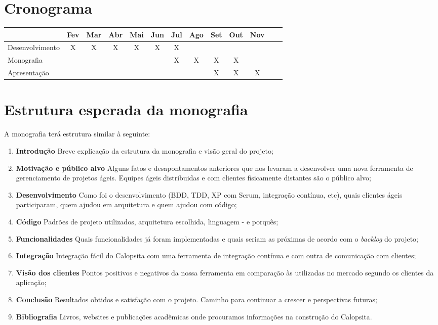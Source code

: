 \documentclass[titlepage]{article}
\begin{document}
\section{Cronograma}
{\small
\begin{tabular}{|l|c|c|c|c|c|c|c|c|c|c|c|c|}
  \hline
  & Fev & Mar & Abr & Mai & Jun & Jul & Ago & Set & Out & Nov \\ \hline
  Desenvolvimento	& X& X& X& X& X& X&  &  &  &   \\ \hline
  Monografia			&  &  &  &  &  & X& X& X& X&   \\ \hline
  Apresentação 		&  &  &  &  &  &  &  & X& X& X \\ \hline
\end{tabular}}

\section{Estrutura esperada da monografia}

A monografia terá estrutura similar à seguinte:

\begin{enumerate}
	\item{\textbf{Introdução} Breve explicação da estrutura da monografia e visão geral do projeto;}
	\item{\textbf{Motivação e público alvo} Alguns fatos e desapontamentos anteriores que nos levaram a desenvolver uma nova ferramenta de gerenciamento de projetos ágeis. Equipes ágeis distribuidas e com clientes fisicamente distantes são o público alvo;}
	\item{\textbf{Desenvolvimento} Como foi o desenvolvimento (BDD, TDD, XP com Scrum, integração contínua, etc), quais clientes ágeis participaram, quem ajudou em arquitetura e quem ajudou com código;}
	\item{\textbf{Código} Padrões de projeto utilizados, arquitetura escolhida, linguagem - e porquês;}
	\item{\textbf{Funcionalidades} Quais funcionalidades já foram implementadas e quais seriam as próximas de acordo com o \textit{backlog} do projeto;}
	\item{\textbf{Integração} Integração fácil do Calopsita com uma ferramenta de integração contínua e com outra de comunicação com clientes;}
	\item{\textbf{Visão dos clientes} Pontos positivos e negativos da nossa ferramenta em comparação às utilizadas no mercado segundo os clientes da aplicação;}
	\item{\textbf{Conclusão} Resultados obtidos e satisfação com o projeto. Caminho para continuar a crescer e perspectivas futuras;}
	\item{\textbf{Bibliografia} Livros, websites e publicações acadêmicas onde procuramos informações na construção do Calopsita.}
\end{enumerate}
\end{document}
